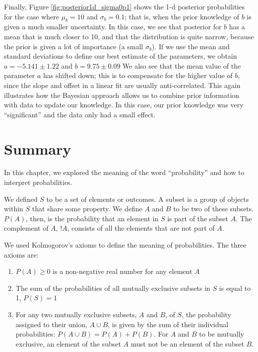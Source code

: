 
Finally, Figure \ref{fig:posterior1d_sigma0p1} shows the 1-d posterior probabilities for the case where $\mu_b=10$ and $\sigma_b=0.1$; that is, when the prior knowledge of $b$ is given a much smaller uncertainty. In this case, we see that posterior for $b$ has a mean that is much closer to 10, and that the distribution is quite narrow, because the prior is given a lot of importance (a small $\sigma_b$). If we use the mean and standard deviations to define our best estimate of the parameters, we obtain $a=-5.141\pm1.22$ and $b=9.75 \pm 0.09$ We also see that the mean value of the parameter $a$ has shifted down; this is to compensate for the higher value of $b$, since the slope and offset in a linear fit are usually anti-correlated. This again illustrates how the Bayesian approach allows us to combine prior information with data to update our knowledge. In this case, our prior knowledge was very ``significant'' and the data only had a small effect.


\section{Summary}
In this chapter, we explored the meaning of the word ``probability'' and how to interpret probabilities.

We defined $S$ to be a set of elements or outcomes. A subset is a group of objects within $S$ that share some property. We define $A$ and $B$ to be two of these subsets. $P(A)$, then, is the probability that an element in $S$ is part of the subset $A$. The complement of $A$, $!A$,  consists of all the elements that are not part of $A$.

We used Kolmogorov's axioms to define the meaning of probabilities. The three axioms are:
\begin{enumerate}
\item $P(A) \geq 0$ is a non-negative real number for any element $A$
\item The sum of the probabilities of all mutually exclusive subsets in $S$ is equal to 1, $P(S) = 1$
\item For any two mutually exclusive subsets, $A$ and $B$, of $S$, the probability assigned to their union, $A \cup B$, is given by the sum of their individual probabilities: $P(A \cup B) = P(A) + P(B)$. For $A$ and $B$ to be mutually exclusive, an element of the subset $A$ must not be an element of the subset $B$.
\end{enumerate}


